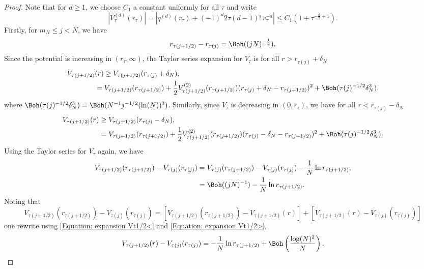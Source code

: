 \begin{proof}
Note that for $d \geq 1$, we choose $C_1$ a constant uniformly for all $\tau$ and write
\begin{equation}
	|V^{(d)}_\tau(r_\tau)| = |q^{(d)}(r_\tau) + (-1)^{d} 2 \tau (d-1)! \ r_\tau^{-d} | \leq C_1 (1 + \tau^{-\frac{d}{2} + 1}).
\end{equation}
Firstly, for $m_N \leq j < N$, we have
\begin{equation}
	r_{\tau(j + 1/2)} - r_{\tau(j)} = \Boh((jN)^{-\frac{1}{2}}).
\end{equation}
Since the potential is increasing in $(r_\tau, \infty)$, the Taylor series expansion for $V_\tau$ is for all $r > r_{\tau(j)} + \delta_N$
\begin{align}	\label{Equation: expansion Vt1/2>}	
	V_{\tau(j +1/2)}& (r) \geq V_{\tau(j +1/2)}(r_{\tau(j)} + \delta_N), \\
	& = V_{\tau(j + 1/2)}(r_{\tau(j +1/2)}) + \frac{1}{2} V^{(2)}_{\tau(j + 1/2)}(r_{\tau(j + 1/2)}) (r_{\tau(j)} + \delta_N - r_{\tau(j + 1/2)})^2 + \Boh(\tau(j)^{-1/2} \delta^3_N).
\end{align}
where $\Boh(\tau(j)^{-1/2} \delta^3_N) = \Boh(N^{-1} j^{-1/2}(\ln(N))^3)$. Similarly, since $V_{\tau}$ is decreasing in $(0, r_\tau)$, we have for all $r < r_{\tau(j)} - \delta_N$
\begin{align}
	V_{\tau(j + 1/2)}(r) & \geq V_{\tau(j +1/2)}(r_{\tau(j)} - \delta_N), \\
	& = V_{\tau(j + 1/2)}(r_{\tau(j + 1/2)}) + \frac{1}{2} V^{(2)}_{\tau(j + 1/2)}(r_{\tau(j + 1/2)}) (r_{\tau(j)} - \delta_N - r_{\tau(j + 1/2)})^2 + \Boh(\tau(j)^{-1/2} \delta^3_N).
	\label{Equation: expansion Vt1/2<}
\end{align}
Using the Taylor series for $V_\tau$ again, we have
\begin{align}
	V_{\tau(j+1/2)}(r_{\tau(j+1/2)}) - V_{\tau(j)}(r_{\tau(j)}) & = V_{\tau(j)}(r_{\tau(j+1/2)}) - V_{\tau(j)}(r_{\tau(j)}) - \frac{1}{N} \ln r_{\tau(j+1/2)}, \\
	& = \Boh((jN)^{-1})  - \frac{1}{N} \ln r_{\tau(j+1/2)}.
\end{align}
Noting that
\begin{equation}
	V_{\tau(j+1/2)}(r_{\tau(j+1/2)}) - V_{\tau(j)}(r_{\tau(j)})
	= [V_{\tau(j+1/2)}(r_{\tau(j+1/2)}) - V_{\tau(j+1/2)}(r)] + [V_{\tau(j+1/2)}(r) - V_{\tau(j)}(r_{\tau(j)})]
\end{equation}
one rewrite using \eqref{Equation: expansion Vt1/2<} and \eqref{Equation: expansion Vt1/2>},
\begin{equation}
	V_{\tau(j+1/2)}(r) - V_{\tau(j)}(r_{\tau(j)}) = - \frac{1}{N} \ln r_{\tau(j+1/2)} + \Boh\left(\frac{\log(N)^2}{N}\right).
\end{equation}


\end{proof}
